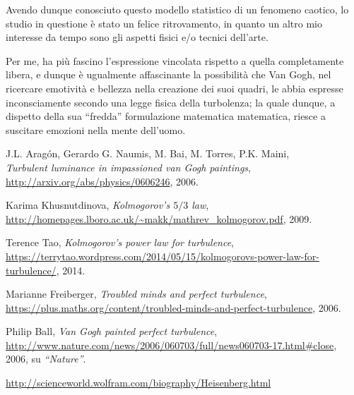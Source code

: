 \documentclass[12pt,a4paper]{article}
\numberwithin{equation}{subsection}
\begin{document}
Avendo dunque conosciuto questo modello statistico di un fenomeno caotico, lo studio in questione \cite{study2006} è stato un felice ritrovamento, in quanto un altro mio interesse da tempo sono gli aspetti fisici e/o tecnici dell'arte.

Per me, ha più fascino l'espressione vincolata rispetto a quella completamente libera, e dunque è ugualmente affascinante la possibilità che Van Gogh, nel ricercare emotività e bellezza nella creazione dei suoi quadri, le abbia espresse inconsciamente secondo una legge fisica della turbolenza; la quale dunque, a dispetto della sua ``fredda'' formulazione matematica matematica, riesce a suscitare emozioni nella mente dell'uomo.

\begin{thebibliography}{1}

  J.L. Aragón, Gerardo G. Naumis, M. Bai, M. Torres, P.K. Maini, \\
  \emph{Turbulent luminance in impassioned van Gogh paintings}, \\
  \url{http://arxiv.org/abs/physics/0606246}, 
  2006.

  Karima Khusnutdinova, 
  \emph{Kolmogorov's $5/3$ law}, \\
  \url{http://homepages.lboro.ac.uk/~makk/mathrev_kolmogorov.pdf},
  2009.
  
  Terence Tao,
  \emph{Kolmogorov’s power law for turbulence}, \\
  \url{https://terrytao.wordpress.com/2014/05/15/kolmogorovs-power-law-for-turbulence/}, 2014.

  Marianne Freiberger, 
  \emph{Troubled minds and perfect turbulence}, \\
  \url{https://plus.maths.org/content/troubled-minds-and-perfect-turbulence},
  2006.
  
  Philip Ball, 
  \emph{Van Gogh painted perfect turbulence}, \\
  \url{http://www.nature.com/news/2006/060703/full/news060703-17.html#close},
  2006,
  su \emph{``Nature''}.

  \url{http://scienceworld.wolfram.com/biography/Heisenberg.html}

\end{thebibliography}
\end{document}
